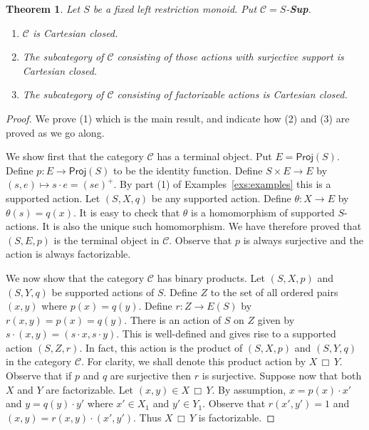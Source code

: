 \documentclass[a4paper]{amsart}
\newtheorem{theorem}{Theorem}[section]
\begin{document}
\begin{theorem}\label{them:CCV1} Let $S$ be a fixed left restriction monoid.
Put $\mathscr{C} = S$-{\bf Sup}.
\begin{enumerate}
\item $\mathscr{C}$ is Cartesian closed.
\item The subcategory of $\mathscr{C}$ consisting of those actions with surjective support is Cartesian closed.
\item The subcategory of $\mathscr{C}$ consisting of factorizable actions is Cartesian closed.
\end{enumerate}
\end{theorem}
\begin{proof} We prove (1) which is the main result, and indicate how (2) and (3) are proved as we go along.

We show first that the category $\mathscr{C}$ has a terminal object.
Put $E = \mathsf{Proj}(S)$.
Define $p \colon E \rightarrow \mathsf{Proj}(S)$ to be the identity function.
Define $S \times E \rightarrow E$ by $(s,e) \mapsto s \cdot e = (se)^{+}$.
By part (1) of Examples~\ref{exs:examples} this is a supported action.
Let $(S,X,q)$ be any supported action.
Define $\theta \colon X \rightarrow E$ by $\theta (s) = q(x)$.
It is easy to check that $\theta$ is a homomorphism of supported $S$-actions.
It is also the unique such homomorphism.
We have therefore proved that $(S,E,p)$ is the terminal object in $\mathscr{C}$. 
Observe that $p$ is always surjective and the action is always factorizable.

We now show that the category $\mathscr{C}$ has binary products.
Let $(S,X,p)$ and $(S,Y,q)$ be supported actions of $S$.
Define $Z$ to the set of all ordered pairs $(x,y)$ where $p(x) = q(y)$. 
Define $r \colon Z \rightarrow E(S)$ by $r(x,y) = p(x) = q(y)$.
There is an action of $S$ on $Z$ given by $s \cdot (x,y) = (s \cdot x, s \cdot y)$.
This is well-defined and gives rise to a supported action $(S,Z,r)$.
In fact, this action is the product of $(S,X,p)$ and $(S,Y,q)$ in the category $\mathscr{C}$.
For clarity, we shall denote this product action by $X \,\Box \, Y$.
Observe that if $p$ and $q$ are surjective then $r$ is surjective.
Suppose now that both $X$ and $Y$ are factorizable.
Let $(x,y) \in X \, \Box \, Y$.
By assumption, $x = p(x) \cdot x'$ and $y = q(y) \cdot y'$  where $x' \in X_{1}$ and $y' \in Y_{1}$.
Observe that $r(x',y') = 1$ and $(x,y) = r(x,y) \cdot (x',y')$.
Thus $X \, \Box \, Y$ is factorizable.


\end{proof}
\end{document}
